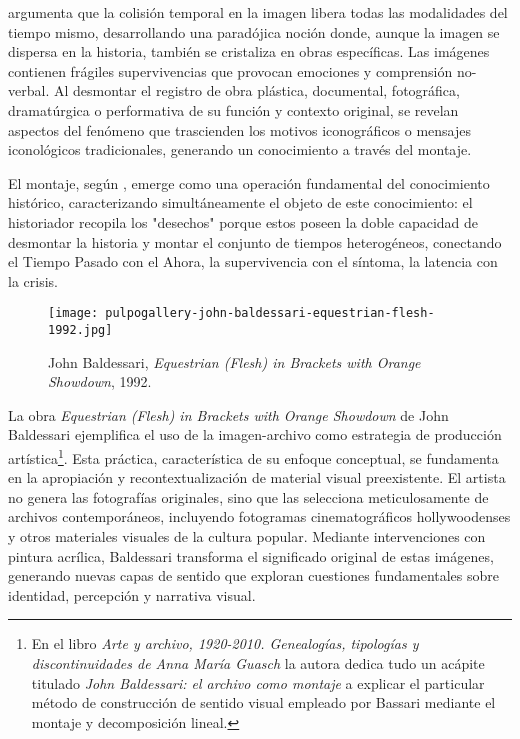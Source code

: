 \parencite{DidiHuberman2011} argumenta que la colisión temporal en la imagen libera todas las modalidades del tiempo mismo, desarrollando una paradójica noción donde, aunque la imagen se dispersa en la historia, también se cristaliza en obras específicas. Las imágenes contienen frágiles supervivencias que provocan emociones y comprensión no-verbal. Al desmontar el registro de obra plástica, documental, fotográfica, dramatúrgica o performativa de su función y contexto original, se revelan aspectos del fenómeno que trascienden los motivos iconográficos o mensajes iconológicos tradicionales, generando un conocimiento a través del montaje.

El montaje, según \parencite{DidiHuberman2011}, emerge como una operación fundamental del conocimiento histórico, caracterizando simultáneamente el objeto de este conocimiento: el historiador recopila los "desechos" porque estos poseen la doble capacidad de desmontar la historia y montar el conjunto de tiempos heterogéneos, conectando el Tiempo Pasado con el Ahora, la supervivencia con el síntoma, la latencia con la crisis.


\begin{figure}[h!]
    \centering
    \texttt{[image: pulpogallery-john-baldessari-equestrian-flesh-1992.jpg]}
    \caption{John Baldessari, \textit{Equestrian (Flesh) in Brackets with Orange Showdown}, 1992.}
    \label{fig:baldessari_equestrian}
\end{figure}


La obra \textit{Equestrian (Flesh) in Brackets with Orange Showdown} de John Baldessari ejemplifica el uso de la imagen-archivo como estrategia de producción artística\footnote{En el libro \textit{Arte y archivo, 1920-2010. Genealogías, tipologías y discontinuidades de Anna María Guasch} la autora dedica tudo un acápite titulado \textit{John Baldessari: el archivo como montaje} a explicar el  particular método de construcción de sentido visual empleado por Bassari mediante el montaje y decomposición lineal.}. Esta práctica, característica de su enfoque conceptual, se fundamenta en la apropiación y recontextualización de material visual preexistente. El artista no genera las fotografías originales, sino que las selecciona meticulosamente de archivos contemporáneos, incluyendo fotogramas cinematográficos hollywoodenses y otros materiales visuales de la cultura popular. Mediante intervenciones con pintura acrílica, Baldessari transforma el significado original de estas imágenes, generando nuevas capas de sentido que exploran cuestiones fundamentales sobre identidad, percepción y narrativa visual.


